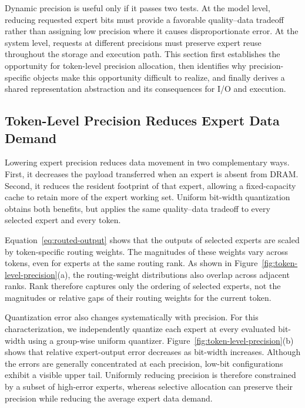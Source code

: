 \documentclass[sigconf, nonacm]{acmart}
\begin{document}
Dynamic precision is useful only if it passes two tests. At the model
level, reducing requested expert bits must provide a favorable
quality--data tradeoff rather than assigning low precision where it
causes disproportionate error. At the system level, requests at
different precisions must preserve expert reuse throughout the storage
and execution path. This section first establishes the opportunity for
token-level precision allocation, then identifies why precision-specific
objects make this opportunity difficult to realize, and finally derives
a shared representation abstraction and its consequences for I/O and
execution.

\subsection{Token-Level Precision Reduces Expert Data Demand}
\label{sec:dynamic-precision-opportunity}

Lowering expert precision reduces data movement in two complementary
ways. First, it decreases the payload transferred when an expert is
absent from DRAM. Second, it reduces the resident footprint of that
expert, allowing a fixed-capacity cache to retain more of the expert
working set. Uniform bit-width quantization obtains both benefits, but applies
the same quality--data tradeoff to every selected expert and every
token. 

Equation~\ref{eq:routed-output} shows that the outputs of selected
experts are scaled by token-specific routing weights. The magnitudes of
these weights vary across tokens, even for experts at the same routing
rank. As shown in Figure~\ref{fig:token-level-precision}(a), the
routing-weight distributions also overlap across adjacent ranks. Rank
therefore captures only the ordering of selected experts, not the
magnitudes or relative gaps of their routing weights for the current
token.

Quantization error also changes systematically with precision. For
this characterization, we independently quantize each expert at every
evaluated bit-width using a group-wise uniform quantizer.
Figure~\ref{fig:token-level-precision}(b) shows that relative
expert-output error decreases as bit-width increases. Although the
errors are generally concentrated at each precision, low-bit
configurations exhibit a visible upper tail. Uniformly reducing
precision is therefore constrained by a subset of high-error experts,
whereas selective allocation can preserve their precision while
reducing the average expert data demand.
\end{document}
